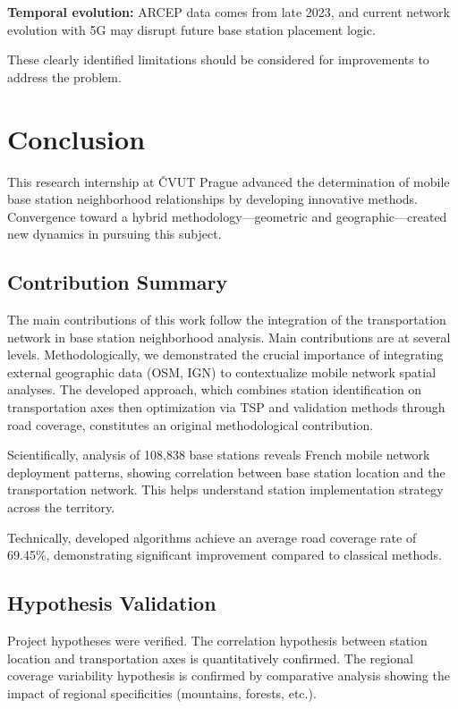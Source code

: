 \documentclass[12pt,a4paper]{report}
\begin{document}
\textbf{Temporal evolution:} ARCEP data comes from late 2023, and current network evolution with 5G may disrupt future base station placement logic.

These clearly identified limitations should be considered for improvements to address the problem.

\chapter*{Conclusion}

This research internship at ČVUT Prague advanced the determination of mobile base station neighborhood relationships by developing innovative methods. Convergence toward a hybrid methodology—geometric and geographic—created new dynamics in pursuing this subject.

\section*{Contribution Summary}

The main contributions of this work follow the integration of the transportation network in base station neighborhood analysis. Main contributions are at several levels. Methodologically, we demonstrated the crucial importance of integrating external geographic data (OSM, IGN) to contextualize mobile network spatial analyses. The developed approach, which combines station identification on transportation axes then optimization via TSP and validation methods through road coverage, constitutes an original methodological contribution.

Scientifically, analysis of 108,838 base stations reveals French mobile network deployment patterns, showing correlation between base station location and the transportation network. This helps understand station implementation strategy across the territory.

Technically, developed algorithms achieve an average road coverage rate of 69.45\%, demonstrating significant improvement compared to classical methods.

\section*{Hypothesis Validation}

Project hypotheses were verified. The correlation hypothesis between station location and transportation axes is quantitatively confirmed. The regional coverage variability hypothesis is confirmed by comparative analysis showing the impact of regional specificities (mountains, forests, etc.).
\end{document}
